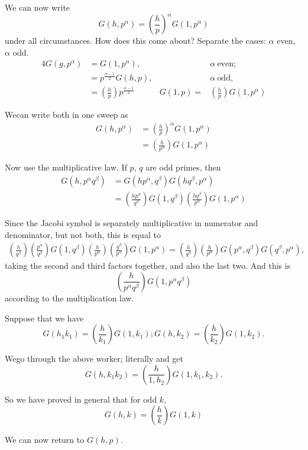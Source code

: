 We can now write
$$
G(h, p^\alpha)= \left(\frac{h}{p} \right)^\alpha G(1, p^\alpha) 
$$
under all circumstances. How does this come about? Separate the cases:
$\alpha$ even, $\alpha$ odd.
\begin{alignat*}{4}
  G(g, p^\alpha) & = G(1, p^\alpha), && \alpha ~\text{even};\\
  & = p^{\frac{\alpha-1}{2}} G(h, p), && \alpha ~\text{odd},\\
  & = \left(\frac{h}{p} \right)  p^{\frac{\alpha-1}{2}}& G(1, p) =
  & \left(\frac{h}{p} \right)  G(1, p^\alpha)
 \end{alignat*}

We\pageoriginale can write both in one sweep as
\begin{align*}
  G(h, p^\alpha) & = \left(\frac{h}{p} \right)^\alpha G(1, p^\alpha)\\
  & = \left(\frac{h}{p^\alpha} \right) G(1, p^\alpha) 
\end{align*}

Now use the multiplicative law. If $p$, $q$ are odd primes, then 
\begin{align*}
  G(h, p^\alpha q^\beta) & = G(hp^\alpha, q^{\beta}) G(hq^\beta,
  p^\alpha)\\
  & = \left(\frac{hp^\alpha}{q^\beta} \right) G(1, q^\beta)
  \left(\frac{hq^\beta}{p^\alpha} \right) G(1, p^\alpha)   
\end{align*}

Since the Jacobi symbol is separately multiplicative in numerator and
denominator, but not both, this is equal to 
\begin{multline*}
  \left(\frac{h}{q^\beta} \right)
  \left(\frac{p^\alpha}{q^\beta}\right) G(1, q^\beta)
  \left(\frac{h}{p^\alpha}\right) \left(\frac{q^\beta}{p^\alpha}
  \right) G(1, p^\alpha)
  = \left(\frac{h}{q^\beta} \right) \left(\frac{h}{p^\alpha}
  \right)G(p^\alpha, q^\beta) G(q^\beta, p^\alpha),
\end{multline*}
taking the second and third factors together, and also the last
two. And this is 
$$
\left(\frac{h}{p^\alpha q^\beta} \right)  G(1, p^\alpha q^\beta)
$$
according to the multiplication law.

Suppose that we have
$$
G(h_1k_1)= \left(\frac{h}{k_1} \right)  G(1, k_1); G(h, k_2) =
\left(\frac{h}{k_2} \right) G(1, k_2).  
$$

We\pageoriginale go through the above worker; literally and get 
$$
G(h, k_1 k_2) = \left(\frac{h}{1,h_2} \right) G(1, k_1, k_2). 
$$

So we have proved in general that for odd $k$,
$$
G(h, k)= \left(\frac{h}{k} \right) G(1, k) 
$$

We can now return to $G(h, p)$.

